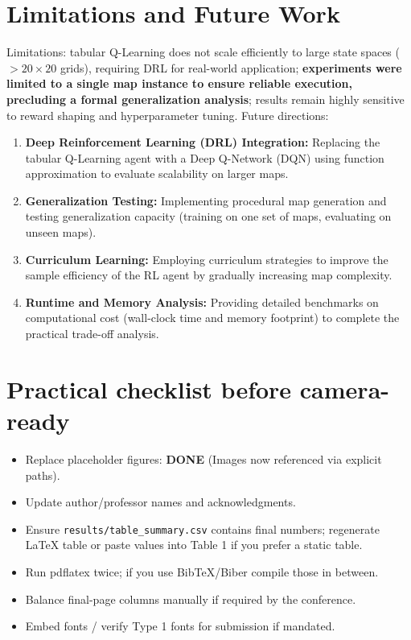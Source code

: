 \documentclass[conference]{IEEEtran}
\begin{document}
	\section{Limitations and Future Work}
	\label{sec:limitations} %
	Limitations: tabular Q-Learning does not scale efficiently to large state spaces ($>20 \times 20$ grids), requiring DRL for real-world application; \textbf{experiments were limited to a single map instance to ensure reliable execution, precluding a formal generalization analysis}; results remain highly sensitive to reward shaping and hyperparameter tuning. Future directions:
	\begin{enumerate}
		\item \textbf{Deep Reinforcement Learning (DRL) Integration:} Replacing the tabular Q-Learning agent with a Deep Q-Network (DQN) using function approximation to evaluate scalability on larger maps.
		\item \textbf{Generalization Testing:} Implementing procedural map generation and testing generalization capacity (training on one set of maps, evaluating on unseen maps).
		\item \textbf{Curriculum Learning:} Employing curriculum strategies to improve the sample efficiency of the RL agent by gradually increasing map complexity.
		\item \textbf{Runtime and Memory Analysis:} Providing detailed benchmarks on computational cost (wall-clock time and memory footprint) to complete the practical trade-off analysis.
	\end{enumerate}
	
	\section{Practical checklist before camera-ready}
	\begin{itemize}
		\item Replace placeholder figures: \textbf{DONE} (Images now referenced via explicit paths).
		\item Update author/professor names and acknowledgments.
		\item Ensure \texttt{results/table\_summary.csv} contains final numbers; regenerate LaTeX table or paste values into Table 1 if you prefer a static table.
		\item Run pdflatex twice; if you use BibTeX/Biber compile those in between.
		\item Balance final-page columns manually if required by the conference.
		\item Embed fonts / verify Type 1 fonts for submission if mandated.
	\end{itemize}
	
\end{document}
